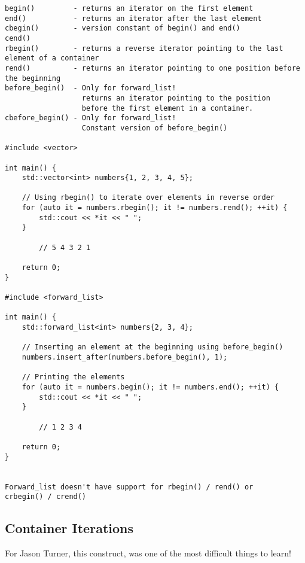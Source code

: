 \begin{verbatim}
begin()         - returns an iterator on the first element 
end()           - returns an iterator after the last element
cbegin()        - version constant of begin() and end()
cend()  
rbegin()        - returns a reverse iterator pointing to the last element of a container
rend()          - returns an iterator pointing to one position before the beginning
before_begin()  - Only for forward_list! 
                  returns an iterator pointing to the position
                  before the first element in a container.  
cbefore_begin() - Only for forward_list!
                  Constant version of before_begin()

#include <vector>

int main() {
    std::vector<int> numbers{1, 2, 3, 4, 5};

    // Using rbegin() to iterate over elements in reverse order
    for (auto it = numbers.rbegin(); it != numbers.rend(); ++it) {
        std::cout << *it << " ";
    }

        // 5 4 3 2 1

    return 0;
}

#include <forward_list>

int main() {
    std::forward_list<int> numbers{2, 3, 4};

    // Inserting an element at the beginning using before_begin()
    numbers.insert_after(numbers.before_begin(), 1);

    // Printing the elements
    for (auto it = numbers.begin(); it != numbers.end(); ++it) {
        std::cout << *it << " ";
    }
    
        // 1 2 3 4

    return 0;
}


Forward_list doesn't have support for rbegin() / rend() or
crbegin() / crend()
\end{verbatim}


\subsection{Container Iterations}

For Jason Turner, this construct, was one of the most difficult things to learn!

